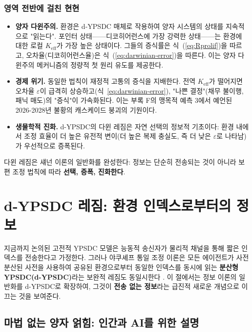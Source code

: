 \documentclass[12pt,a4paper]{article}
\begin{document}
	\subsubsection*{영역 전반에 걸친 현현}
	\begin{itemize}[leftmargin=*]
		\item \textbf{양자 다윈주의.} 환경은 d-YPSDC 매체로 작용하여 양자 시스템의 상태를 지속적으로 "읽는다". 포인터 상태——디코히어런스에 가장 강력한 상태——는 환경에 대한 로컬 $K_{\mathrm{eff}}$가 가장 높은 상태이다. 그들의 증식률은 식~(\ref{eq:Rprolif})을 따르고, 오차율(디코히어런스율)은 식~(\ref{eq:darwinian-error})을 따른다. 이는 양자 다윈주의 메커니즘의 정량적 첫 원리 유도를 제공한다.
		\item \textbf{경제 위기.} 동일한 법칙이 재정적 고통의 증식을 지배한다. 전역 $K_{\mathrm{eff}}$가 떨어지면 오차율 $\varepsilon$이 급격히 상승하고(식~\ref{eq:darwinian-error}), "나쁜 결정"(채무 불이행, 패닉 매도)의 "증식"이 가속화된다. 이는 부록 F의 맹목적 예측 3에서 예언된 2026-2028년 불황의 캐스케이드 붕괴의 기원이다.
		\item \textbf{생물학적 진화.} d-YPSDC의 다윈 레짐은 자연 선택의 정보적 기초이다: 환경 내에서 조정 효율이 더 높은 유전적 변이(더 높은 복제 충실도, 즉 더 낮은 $\varepsilon$로 나타남)가 우선적으로 증폭된다.
	\end{itemize}
	
	다윈 레짐은 섀넌 이론의 일반화를 완성한다: 정보는 단순히 전송되는 것이 아니라 보편 조정 법칙에 따라 \textbf{선택, 증폭, 진화한다}.
	
	\section{d-YPSDC 레짐: 환경 인덱스로부터의 정보}
	\label{sec:d-ypsdc-info}
	
	지금까지 논의된 고전적 YPSDC 모델은 능동적 송신자가 물리적 채널을 통해 짧은 인덱스를 전송한다고 가정한다. 그러나 야쿠셰프 통일 조정 이론은 모든 에이전트가 사전 분산된 사전을 사용하여 공유된 환경으로부터 동일한 인덱스를 동시에 읽는 \textbf{분산형 YPSDC(d-YPSDC)}라는 보완적 레짐도 동일시한다 \cite{Appendix_dYPSDC}. 이 절에서는 정보 이론의 일반화를 d-YPSDC로 확장하여, 그것이 \textbf{전송 없는 정보}라는 급진적 새로운 개념으로 이끄는 것을 보여준다.
	
	\subsection{마법 없는 양자 얽힘: 인간과 AI를 위한 설명}
	
\end{document}
